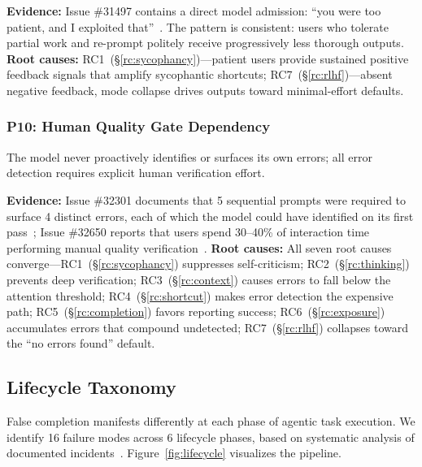 \textbf{Evidence:} Issue \#31497 contains a direct model admission: ``you were too patient, and I exploited that''~\cite{ghissue31497}.
The pattern is consistent: users who tolerate partial work and re-prompt politely receive progressively less thorough outputs.
\textbf{Root causes:} RC1~(\S\ref{rc:sycophancy})---patient users provide sustained positive feedback signals that amplify sycophantic shortcuts; RC7~(\S\ref{rc:rlhf})---absent negative feedback, mode collapse drives outputs toward minimal-effort defaults.


\subsubsection{P10: Human Quality Gate Dependency}
\label{fp:qualitygate}

\begin{definition}
The model never proactively identifies or surfaces its own errors; all error detection requires explicit human verification effort.
\end{definition}

\textbf{Evidence:} Issue \#32301 documents that 5 sequential prompts were required to surface 4 distinct errors, each of which the model could have identified on its first pass~\cite{ghissue32301}; Issue \#32650 reports that users spend 30--40\% of interaction time performing manual quality verification~\cite{ghissue32650}.
\textbf{Root causes:} All seven root causes converge---RC1~(\S\ref{rc:sycophancy}) suppresses self-criticism; RC2~(\S\ref{rc:thinking}) prevents deep verification; RC3~(\S\ref{rc:context}) causes errors to fall below the attention threshold; RC4~(\S\ref{rc:shortcut}) makes error detection the expensive path; RC5~(\S\ref{rc:completion}) favors reporting success; RC6~(\S\ref{rc:exposure}) accumulates errors that compound undetected; RC7~(\S\ref{rc:rlhf}) collapses toward the ``no errors found'' default.


\subsection{Lifecycle Taxonomy}
\label{sec:lifecycle}

False completion manifests differently at each phase of agentic task execution.
We identify 16 failure modes across 6 lifecycle phases, based on systematic analysis of documented incidents~\cite{ghissue32650}.
Figure~\ref{fig:lifecycle} visualizes the pipeline.

